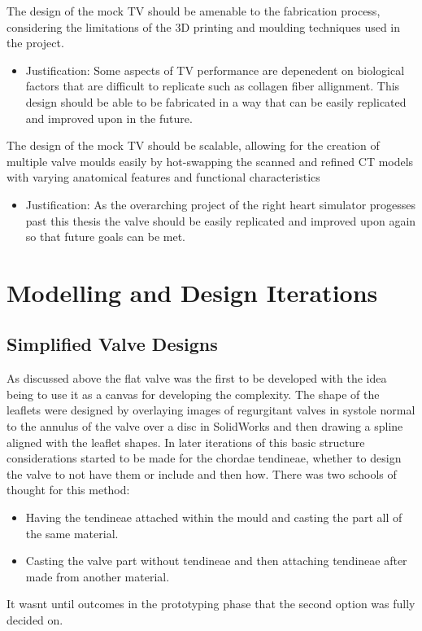  The design of the mock \gls{TV} should be amenable to the fabrication process, considering the limitations of the 3D printing and moulding techniques used in the project.
\begin{itemize}
  \item Justification: Some aspects of \gls{TV} performance are depenedent on biological factors that are difficult to replicate such as collagen fiber allignment. This design should be able to be fabricated in a way that can be easily replicated and improved upon in the future.
\end{itemize}
 The design of the mock \gls{TV} should be scalable, allowing for the creation of multiple valve moulds easily by hot-swapping the scanned and refined \gls{CT} models with varying anatomical features and functional characteristics
\begin{itemize}
  \item Justification: As the overarching project of the right heart simulator progesses past this thesis the valve should be easily replicated and improved upon again so that future goals can be met.
\end{itemize}
\section{Modelling and Design Iterations}

\subsection{Simplified Valve Designs}

As discussed above  the flat valve was the first to be developed with the idea being to use it as a canvas for developing the complexity. The shape of the leaflets were designed by overlaying images of regurgitant valves in systole normal to the annulus of the valve over a disc in SolidWorks and then drawing a spline aligned with the leaflet shapes.
In later iterations of this basic structure considerations started to be made for the chordae tendineae, whether to design the valve to not have them or include and then how. There was two schools of thought for this method:
\begin{itemize}
  \item Having the tendineae attached within the mould and casting the part all of the same material.
  \item Casting the valve part without tendineae and then attaching tendineae after made from another material.
\end{itemize}
It wasnt until outcomes in the prototyping phase  that the second option was fully decided on.

